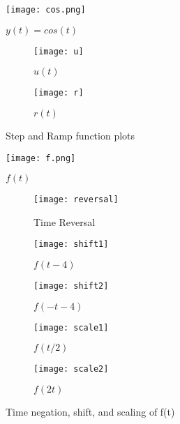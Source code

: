 \documentclass[12pt]{report}
\begin{document}
\begin{figure}[htp]
    \centering
    \texttt{[image: cos.png]}
    \caption{$y(t) = cos(t)$}
\end{figure}

\begin{figure}
     \centering
     \begin{subfigure}[b]{0.5\textwidth}
         \centering
         \texttt{[image: u]}
         \caption{$u(t)$}
         \label{fig:y equals x}
     \end{subfigure}
     \hfill
     \begin{subfigure}[b]{0.5\textwidth}
         \centering
         \texttt{[image: r]}
         \caption{$r(t)$}
         \label{fig:three sin x}
     \end{subfigure}
        \caption{Step and Ramp function plots}
        \label{fig:three graphs}
\end{figure}

\begin{figure}[htp]
    \centering
    \texttt{[image: f.png]}
    \caption{$f(t)$}
\end{figure}

\begin{figure}
     \centering
     \begin{subfigure}[b]{0.6\textwidth}
         \centering
         \texttt{[image: reversal]}
         \caption{Time Reversal}
         \label{fig:y equals x}
     \end{subfigure}
     \hfill
     \begin{subfigure}[b]{0.6\textwidth}
         \centering
         \texttt{[image: shift1]}
         \caption{$f(t-4)$}
         \label{fig:three sin x}
     \end{subfigure}
     \hfill
     \begin{subfigure}[b]{0.6\textwidth}
         \centering
         \texttt{[image: shift2]}
         \caption{$f(-t-4)$}
         \label{fig:three sin x}
     \end{subfigure}
     \hfill
     \begin{subfigure}[b]{0.6\textwidth}
         \centering
         \texttt{[image: scale1]}
         \caption{$f(t/2)$}
         \label{fig:three sin x}
     \end{subfigure}
     \hfill
     \begin{subfigure}[b]{0.6\textwidth}
         \centering
         \texttt{[image: scale2]}
         \caption{$f(2t)$}
         \label{fig:three sin x}
     \end{subfigure}
        \caption{Time negation, shift, and scaling of f(t)}
        \label{fig:three graphs}
\end{figure}
\end{document}
